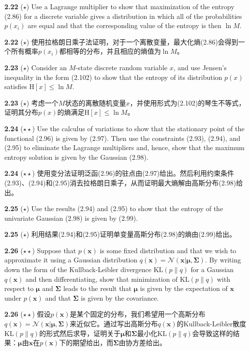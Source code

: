 \documentclass{article}
\begin{document}
\textbf{2.22} ($\star$) Use a Lagrange multiplier to show that maximization of the entropy (2.86) for a discrete variable gives a distribution in which all of the probabilities $p\left(x_{i}\right)$ are equal and that the corresponding value of the entropy is then $\ln M$.

\textbf{2.22} ($\star$) 使用拉格朗日乘子法证明，对于一个离散变量，最大化熵(2.86)会得到一个所有概率$p\left(x_{i}\right)$都相等的分布，并且相应的熵值为$\ln M$。

\textbf{2.23} ($\star$) Consider an $M$-state discrete random variable $x$, and use Jensen's inequality in the form (2.102) to show that the entropy of its distribution $p(x)$ satisfies $\mathrm{H}[x] \leqslant \ln M$.

\textbf{2.23} ($\star$) 考虑一个$M$状态的离散随机变量$x$，并使用形式为(2.102)的琴生不等式，证明其分布$p(x)$的熵满足$\mathrm{H}[x] \leqslant \ln M$。

\textbf{2.24} ($\star\star$) Use the calculus of variations to show that the stationary point of the functional (2.96) is given by (2.97). Then use the constraints (2.93), (2.94), and (2.95) to eliminate the Lagrange multipliers and, hence, show that the maximum entropy solution is given by the Gaussian (2.98).

\textbf{2.24} ($\star\star$) 使用变分法证明泛函(2.96)的驻点由(2.97)给出。然后利用约束条件(2.93)、(2.94)和(2.95)消去拉格朗日乘子，从而证明最大熵解由高斯分布(2.98)给出。

\textbf{2.25} ($\star$) Use the results (2.94) and (2.95) to show that the entropy of the univariate Gaussian (2.98) is given by (2.99).

\textbf{2.25} ($\star$) 利用结果(2.94)和(2.95)证明单变量高斯分布(2.98)的熵由(2.99)给出。

\textbf{2.26} ($\star\star$) Suppose that $p(\mathbf{x})$ is some fixed distribution and that we wish to approximate it using a Gaussian distribution $q(\mathbf{x})=\mathcal{N}(\mathbf{x} | \boldsymbol{\mu}, \boldsymbol{\Sigma})$. By writing down the form of the Kullback-Leibler divergence $\mathrm{KL}(p \| q)$ for a Gaussian $q(\mathbf{x})$ and then differentiating, show that minimization of $\mathrm{KL}(p \| q)$ with respect to $\boldsymbol{\mu}$ and $\boldsymbol{\Sigma}$ leads to the result that $\boldsymbol{\mu}$ is given by the expectation of $\mathbf{x}$ under $p(\mathbf{x})$ and that $\boldsymbol{\Sigma}$ is given by the covariance.

\textbf{2.26} ($\star\star$) 假设$p(\mathbf{x})$是某个固定的分布，我们希望用一个高斯分布$q(\mathbf{x})=\mathcal{N}(\mathbf{x} | \boldsymbol{\mu}, \boldsymbol{\Sigma})$来近似它。通过写出高斯分布$q(\mathbf{x})$的Kullback-Leibler散度$\mathrm{KL}(p \| q)$的形式然后求导，证明关于$\boldsymbol{\mu}$和$\boldsymbol{\Sigma}$最小化$\mathrm{KL}(p \| q)$会导致这样的结果：$\boldsymbol{\mu}$由$\mathbf{x}$在$p(\mathbf{x})$下的期望给出，而$\boldsymbol{\Sigma}$由协方差给出。
\end{document}
